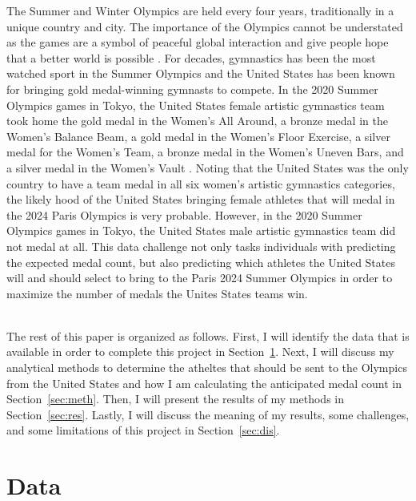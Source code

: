 \documentclass[12pt]{article}
\begin{document}
The Summer and Winter Olympics are held every four years, traditionally in a unique country and city.
 The importance of the Olympics cannot be understated as the games are a symbol of peaceful global 
 interaction and give people hope that a better world is possible \citep{United Nations}. For decades, gymnastics has been 
 the most watched sport in the Summer Olympics and the United States has been known for bringing gold 
 medal-winning gymnasts to compete. In the 2020 Summer Olympics games in Tokyo, the United States 
 female artistic gymnastics team took home the gold medal in the Women's All Around, a bronze medal 
 in the Women's Balance Beam, a gold medal in the Women's Floor Exercise, a silver medal for the Women's
 Team, a bronze medal in the Women's Uneven Bars, and a silver medal in the Women's Vault \citep{Olympics}. 
 Noting that the United States was the only country to have a team medal in all six women's artistic gymnastics 
  categories, the likely hood of the United States bringing female athletes that will medal in the 2024 
  Paris Olympics is very probable. However, in the 2020 Summer Olympics games in Tokyo, the United States 
  male artistic gymnastics team did not medal at all. This data challenge not only tasks individuals 
  with predicting the expected medal count, but also predicting which athletes the United States will 
  and should select to bring to the Paris 2024 Summer Olympics in order to maximize the number of medals 
  the Unites States teams win. 

\\

The rest of this paper is organized as follows. First, I will identify the data that is available
 in order to complete this project in Section~\ref{sec:data}. Next, I will discuss my 
 analytical methods to determine the atheltes that should be sent to the Olympics from the United States and how 
 I am calculating the anticipated medal count in Section~\ref{sec:meth}. Then, I will present the results of my 
 methods in Section~\ref{sec:res}. Lastly, I will discuss the meaning of my results, some challenges, 
 and some limitations of this project in Section~\ref{sec:dis}.

\section{Data}
\label{sec:data}
\end{document}
